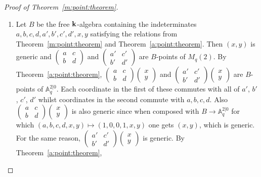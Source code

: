 \documentclass[8pt]{article}
\theoremstyle{definition}
\theoremstyle{definition}
\theoremstyle{definition}
\theoremstyle{definition}
\theoremstyle{definition}
\theoremstyle{definition}
\theoremstyle{definition}
\theoremstyle{definition}
\theoremstyle{definition}
\theoremstyle{definition}
\theoremstyle{definition}
\theoremstyle{definition}
\theoremstyle{definition}
\theoremstyle{definition}
\theoremstyle{question}
\begin{document}
\begin{proof}[Proof of Theorem~\ref{m:point:theorem}]
  $ $
  \begin{enumerate}
    \item Let $B$ be the free ${\bf k}$-algebra containing the indeterminates 
    $a,b,c,d,a',b',c',d',x,y$ satisfying the relations from Theorem~\ref{m:point:theorem} and Theorem~\ref{a:point:theorem}.
    Then $(x, y)$ is generic and
    $\begin{pmatrix} a & c \\ b & d \end{pmatrix}$ and $\begin{pmatrix} a' & c' \\ b' & d' \end{pmatrix}$ 
    are $B$-points of $M_q(2)$. 
    By Theorem~\ref{a:point:theorem},
     $\begin{pmatrix} a & c \\ b & d \end{pmatrix} \begin{pmatrix} x \\ y \end{pmatrix}$ and 
     $\begin{pmatrix} a' & c' \\ b' & d' \end{pmatrix} \begin{pmatrix} x \\ y \end{pmatrix}$
     are $B$-points of $\mathbb{A}^{2|0}_q$. Each coordinate in the first of these commutes
     with all of $a'$, $b'$, $c'$, $d'$ whilst coordinates in the second commute with $a, b, c, d$.
     Also $\begin{pmatrix} a & c \\ b & d \end{pmatrix} \begin{pmatrix} x \\ y \end{pmatrix}$ 
     is also generic since when composed with $B \to \mathbb{A}^{2|0}_q$
     for which $(a,b,c,d,x,y) \mapsto (1,0,0,1,x,y)$ one gets $(x,y)$, which is generic.
     For the same reason, $\begin{pmatrix} a' & c' \\ b' & d' \end{pmatrix} \begin{pmatrix} x \\ y \end{pmatrix}$
     is generic. By Theorem~\ref{a:point:theorem}, 

\end{enumerate}
\end{proof}
\end{document}
